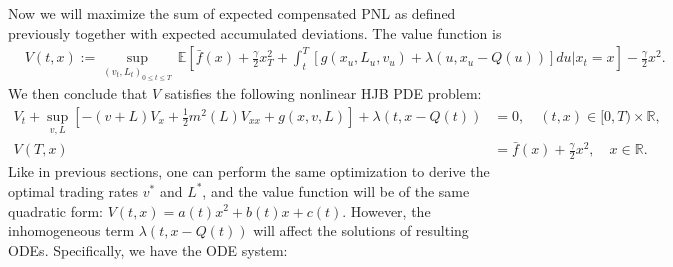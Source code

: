 \documentclass[12pt, letterpaper]{article}
\def\R{{\mathbb R}}        %
\def\E{{\mathbb E}}        %
\numberwithin{equation}{section}
\numberwithin{theorem}{section}
\begin{document}
Now we will maximize the sum of expected compensated PNL as defined previously together with expected accumulated deviations. The value function is \begin{equation}
\begin{aligned}
&V(t,x):=\underset{(v_t,L_t)_{0\le t\le T}}{\sup}\,\E\left[\bar{f}(x)+\frac{\gamma}{2}x_T^2+\int_t^T \left[g(x_u,L_u,v_u) +\lambda(u,x_u-Q(u))\right]du\Big|x_t=x\right]-\frac{\gamma}{2}x^2.
\end{aligned}
\end{equation}
We then conclude that $V$ satisfies the following nonlinear HJB PDE problem:
\begin{equation}
\begin{aligned}
V_t+\underset{v,L}{\sup}\left[-(v+L)V_x+\frac{1}{2}m^2(L)V_{xx}+g(x,v,L)\right]+\lambda(t,x-Q(t)) &= 0, \quad (t,x) \in [0,T) \times \R,\\
V(T,x)&=\bar{f}(x)+\frac{\gamma}{2}x^2, \quad x \in \R.
\end{aligned}
\end{equation}
Like in previous sections, one can perform the same optimization to derive the optimal trading rates $v^*$ and $L^*$, and the value function will be of the same quadratic form: $V(t,x)=a(t)x^2+b(t)x+c(t)$. However, the inhomogeneous term $\lambda(t,x-Q(t))$ will affect the solutions of resulting ODEs. Specifically, we have the ODE system:
\end{document}
